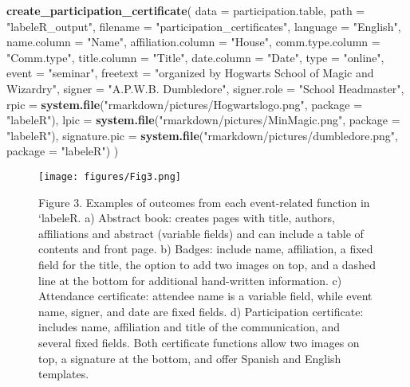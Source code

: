 \documentclass[10pt,a4paper,onecolumn]{article}
\newenvironment{Shaded}{\begin{snugshade}}{\end{snugshade}}
\newcommand{\AttributeTok}[1]{\textcolor[rgb]{0.13,0.29,0.53}{#1}}
\newcommand{\FunctionTok}[1]{\textcolor[rgb]{0.13,0.29,0.53}{\textbf{#1}}}
\newcommand{\NormalTok}[1]{#1}
\newcommand{\StringTok}[1]{\textcolor[rgb]{0.31,0.60,0.02}{#1}}
\begin{document}
\begin{Shaded}
\begin{Highlighting}[]
\FunctionTok{create\_participation\_certificate}\NormalTok{(}
  \AttributeTok{data =}\NormalTok{ participation.table,}
  \AttributeTok{path =} \StringTok{"labeleR\_output"}\NormalTok{,}
  \AttributeTok{filename =} \StringTok{"participation\_certificates"}\NormalTok{,}
  \AttributeTok{language =} \StringTok{"English"}\NormalTok{,}
  \AttributeTok{name.column =} \StringTok{"Name"}\NormalTok{,}
  \AttributeTok{affiliation.column =} \StringTok{"House"}\NormalTok{,}
  \AttributeTok{comm.type.column =} \StringTok{"Comm.type"}\NormalTok{,}
  \AttributeTok{title.column =} \StringTok{"Title"}\NormalTok{,}
  \AttributeTok{date.column =} \StringTok{"Date"}\NormalTok{,}
  \AttributeTok{type =} \StringTok{"online"}\NormalTok{,}
  \AttributeTok{event =} \StringTok{"seminar"}\NormalTok{,}
  \AttributeTok{freetext =} \StringTok{"organized by Hogwarts School of Magic and Wizardry"}\NormalTok{,}
  \AttributeTok{signer =} \StringTok{"A.P.W.B. Dumbledore"}\NormalTok{,}
  \AttributeTok{signer.role =} \StringTok{"School Headmaster"}\NormalTok{,}
  \AttributeTok{rpic =} \FunctionTok{system.file}\NormalTok{(}\StringTok{"rmarkdown/pictures/Hogwartslogo.png"}\NormalTok{, }\AttributeTok{package =} \StringTok{"labeleR"}\NormalTok{),}
  \AttributeTok{lpic =} \FunctionTok{system.file}\NormalTok{(}\StringTok{"rmarkdown/pictures/MinMagic.png"}\NormalTok{, }\AttributeTok{package =} \StringTok{"labeleR"}\NormalTok{),}
  \AttributeTok{signature.pic =} \FunctionTok{system.file}\NormalTok{(}\StringTok{"rmarkdown/pictures/dumbledore.png"}\NormalTok{, }\AttributeTok{package =} \StringTok{"labeleR"}\NormalTok{)}
\NormalTok{)}
\end{Highlighting}
\end{Shaded}

\begin{figure}
\centering
\texttt{[image: figures/Fig3.png]}
\caption{Figure 3. Examples of outcomes from each event-related function
in `labeleR. a) Abstract book: creates pages with title, authors,
affiliations and abstract (variable fields) and can include a table of
contents and front page. b) Badges: include name, affiliation, a fixed
field for the title, the option to add two images on top, and a dashed
line at the bottom for additional hand-written information. c)
Attendance certificate: attendee name is a variable field, while event
name, signer, and date are fixed fields. d) Participation certificate:
includes name, affiliation and title of the communication, and several
fixed fields. Both certificate functions allow two images on top, a
signature at the bottom, and offer Spanish and English templates.}
\end{figure}
\end{document}
